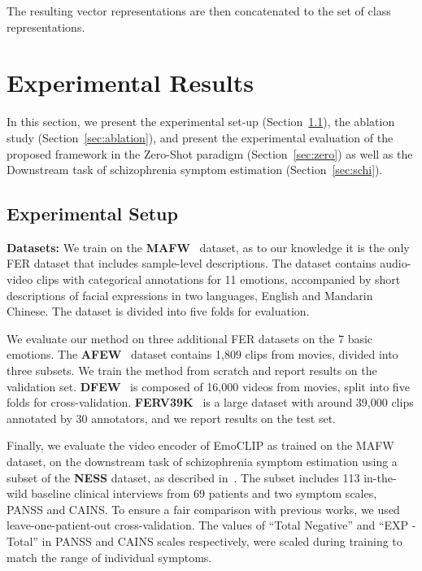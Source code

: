 \documentclass[10pt,twocolumn,letterpaper]{article}
\begin{document}
The resulting vector representations are then concatenated to the set of class representations.



\section{Experimental Results}
\label{sec:res}

In this section, we present the experimental set-up (Section~\ref{sec:setup}), the ablation study (Section~\ref{sec:ablation}), and present the experimental evaluation of the proposed framework in the Zero-Shot paradigm (Section~\ref{sec:zero}) as well as the Downstream task of schizophrenia symptom estimation (Section~\ref{sec:schi}).


\subsection{Experimental Setup}
\label{sec:setup}
\textbf{Datasets:} We train on the \textbf{MAFW}~\cite{liu_mafw_2022} dataset, as to our knowledge it is the only FER dataset that includes sample-level descriptions. The dataset contains  audio-video clips with categorical annotations for 11 emotions, accompanied by short descriptions of facial expressions in two languages, English and Mandarin Chinese. The dataset is divided into five folds for evaluation. 

We evaluate our method on three additional FER datasets on the 7 basic emotions. The \textbf{AFEW}~\cite{afew} dataset contains 1,809 clips from movies, divided into three subsets. We train the method from scratch and report results on the validation set. \textbf{DFEW}~\cite{dfew} is composed of 16,000 videos from movies, split into five folds for cross-validation. \textbf{FERV39K}~\cite{ferv39k} is a large dataset with around 39,000 clips annotated by 30 annotators, and we report results on the test set. 



Finally, we evaluate the video encoder of EmoCLIP as trained on the MAFW dataset, on the downstream task of schizophrenia symptom estimation using a subset of the \textbf{NESS}\cite{ness} dataset, as described in~\cite{bishay2019schinet, foteinopoulou_learning_2022}. The subset includes 113 in-the-wild baseline clinical interviews from 69 patients and two symptom scales, PANSS\cite{kay_positive_1987} and CAINS\cite{forbes_initial_2010}. To ensure a fair comparison with previous works, we used leave-one-patient-out cross-validation. The values of ``Total Negative'' and ``EXP - Total'' in PANSS and CAINS scales respectively, were scaled during training to match the range of individual symptoms.
\end{document}
